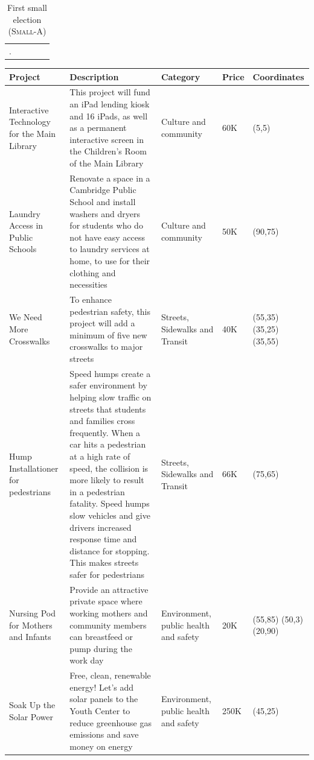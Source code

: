 \documentclass[runningheads]{llncs}
\begin{document}
\begin{longtable}[ht!]{|p{2cm}|p{6cm}|p{3cm}|p{1cm}|p{2.5cm}|}
     \hline
  \caption{First small election (\textsc{Small-A})}\label{tab:first_elc}.
\end{longtable}

\begin{longtable}[ht!]{|p{2cm}|p{6cm}|p{3cm}|p{1cm}|p{2.5cm}|}
    \hline
    \textbf{Project} & \textbf{Description} & \textbf{Category} & \textbf{Price} & \textbf{Coordinates}\\
    \hline
    Interactive Technology for the Main Library & This project will fund an iPad lending kiosk and 16 iPads, as well as a permanent interactive screen in the Children’s Room of the Main Library & Culture and community & 60K & (5,5)\\
    \hline
    Laundry Access in Public Schools & Renovate a space in a Cambridge Public School and install washers and dryers for students who do not have easy access to laundry services at home, to use for their clothing and necessities & Culture and community & 50K & (90,75)\\
    \hline
    We Need More Crosswalks & To enhance pedestrian safety, this project will add a minimum of five new crosswalks to major streets & Streets, Sidewalks and Transit &  40K & (55,35) (35,25) (35,55)\\
    \hline
    Hump Installationer for pedestrians & Speed humps create a safer environment by helping slow traffic on streets that students and families cross frequently. When a car hits a pedestrian at a high rate of speed, the collision is more likely to result in a pedestrian fatality. Speed humps slow vehicles and give drivers increased response time and distance for stopping. This makes streets safer for pedestrians & Streets, Sidewalks and Transit & 66K & (75,65)\\
    \hline
    Nursing Pod for Mothers and Infants & Provide an attractive private space where working mothers and community members can breastfeed or pump during the work day & Environment, public health and safety & 20K & (55,85) (50,3) (20,90)\\
    \hline
    Soak Up the Solar Power & Free, clean, renewable energy! Let’s add solar panels to the Youth Center to reduce greenhouse gas emissions and save money on energy & Environment, public health and safety & 250K & (45,25)\\

\end{longtable}
\end{document}
